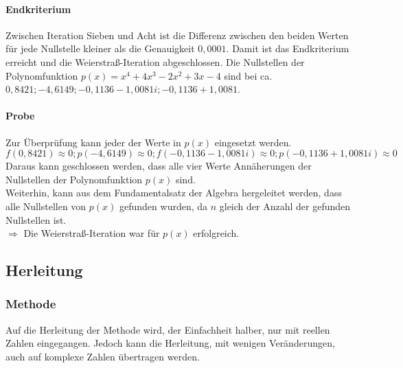 \documentclass[12pt]{article}
\begin{document}
\paragraph{Endkriterium}
Zwischen Iteration Sieben und Acht ist die Differenz zwischen den beiden Werten für jede Nullstelle kleiner als die Genauigkeit $0,0001$. Damit ist das Endkriterium erreicht und die Weierstraß-Iteration abgeschlossen. 
Die Nullstellen der Polynomfunktion $p(x) = x^4 + 4x^3 - 2x^2 + 3x - 4$ sind bei ca. $0,8421; -4,6149; -0,1136 - 1,0081i; -0,1136 + 1,0081$. 
\paragraph{Probe}
Zur Überprüfung kann jeder der Werte in $p(x)$ eingesetzt werden.
\begin{displaymath}
    f(0,8421) \approx 0; p(-4,6149) \approx 0; f(-0,1136 - 1,0081i) \approx 0; p(-0,1136 + 1,0081i) \approx 0
\end{displaymath}
Daraus kann geschlossen werden, dass alle vier Werte Annäherungen der Nullstellen der Polynomfunktion $p(x)$ sind. \\
Weiterhin, kann aus dem Fundamentalsatz der Algebra hergeleitet werden, dass alle Nullstellen von $p(x)$ gefunden wurden, da $n$ gleich der Anzahl der gefunden Nullstellen ist. \\
$\Rightarrow$ Die Weierstraß-Iteration war für $p(x)$ erfolgreich.

\subsection{Herleitung}
\subsubsection{Methode}
Auf die Herleitung der Methode wird, der Einfachheit halber, nur mit reellen Zahlen eingegangen. Jedoch kann die Herleitung, mit wenigen Veränderungen, auch auf komplexe Zahlen übertragen werden.
\end{document}

